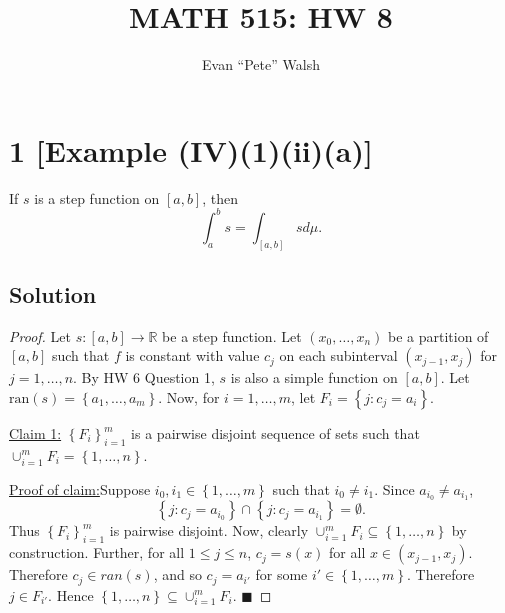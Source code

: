 \documentclass[12pt]{article}
\title{MATH 515: HW 8}
\author{Evan ``Pete'' Walsh}
\newenvironment{claimproof}[1]{\par\noindent\underline{Proof of claim:}\space#1}{\hfill $\blacksquare$\vspace{5mm}}
\begin{document}

\section*{1 [Example (IV)(1)(ii)(a)]}
If $s$ is a step function on $[a,b]$, then 
\[ \int_{a}^{b} s = \int_{[a,b]}sd\mu. \]

\subsection*{Solution}
\begin{proof}
Let $s : [a,b] \rightarrow \mathbb{R}$ be a step function. Let $(x_{0}, \hdots, x_{n})$ be a partition of $[a,b]$ such that $f$ is constant with value
$c_j$ on each subinterval $(x_{j-1},x_{j})$ for $j = 1,\hdots, n$. By HW 6 Question 1, $s$ is also a simple function on $[a,b]$. Let $\text{ran}(s) = \left\{
a_{1}, \hdots, a_{m} \right\}$. Now, for $i = 1,\hdots, m$, let $F_{i} = \left\{ j : c_{j} = a_{i} \right\}$. 

\underline{Claim 1:} $\left\{ F_{i} \right\}_{i=1}^{m}$ is a pairwise disjoint sequence of sets such that $\cup_{i=1}^{m}F_{i} = \left\{ 1,\hdots,
n \right\}$.
\begin{claimproof}
Suppose $i_{0},i_{1} \in \left\{ 1,\hdots, m \right\}$ such that $i_{0}\neq i_{1}$. Since $a_{i_{0}} \neq a_{i_{1}}$,
\[ \left\{ j : c_{j} = a_{i_{0}} \right\} \cap \left\{ j : c_{j} = a_{i_{1}} \right\} = \emptyset. \]
Thus $\left\{ F_{i} \right\}_{i=1}^{m}$ is pairwise disjoint. Now, clearly $\cup_{i=1}^{m}F_{i} \subseteq \left\{ 1,\hdots, n \right\}$ by construction. Further,
for all $1\leq j \leq n$, $c_{j} = s(x)$ for all $x \in (x_{j-1},x_{j})$. Therefore $c_{j} \in ran(s)$, and so $c_{j} = a_{i'}$ for some $i' \in 
\left\{ 1,\hdots, m \right\}$. Therefore $j \in F_{i'}$. Hence $\left\{ 1,\hdots, n \right\} \subseteq \cup_{i=1}^{m}F_{i}$.
\end{claimproof}


\end{proof}
\end{document}
